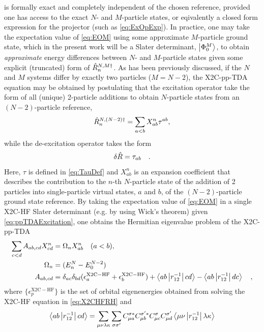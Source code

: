  is formally exact and completely independent of the chosen
reference, provided one has access to the exact $N$- and $M$-particle states,
or eqivalently a closed form expression for the projector (such as \cref{eq:ExOpExp}).
In practice, one may take the expectation value of \cref{eq:EOM} using some
approximate $M$-particle ground state, which in the present work will be
a Slater determinant, $\left\vert \Phi_0^M \right\rangle$, to obtain
\emph{approximate} energy differences between $N$- and $M$-particle states
given some explicit (truncated) form of $\hat{R}^{N,M\dagger}_n$.  As has been previously
discussed, if the $N$ and $M$ systems differ by exactly two particles ($M=N-
2$), the X2C-pp-TDA equation may be obtained by postulating that the excitation
operator take the form of all (unique) 2-particle additions to obtain
$N$-particle states from an $(N-2)$-particle reference,
\begin{equation}
  \hat{R}_n^{N,(N-2)\dagger} = \sum_{a < b} X^n_{ab} \tau^{ab} , \label{eq:ppTDAExcitation}
\end{equation}
while the de-excitation operator takes the form
\begin{equation}
  \delta\hat{R} = \tau_{ab}\quad.
\end{equation}
Here, $\tau$ is defined in \cref{eq:TauDef} and $X^n_{ab}$ is an expansion
coefficient that describes the contribution to the $n$-th $N$-particle state of
the addition of 2 particles into single-particle virtual states, $a$ and $b$,
of the $(N-2)$-particle ground state reference. By taking the expectation value
of \cref{eq:EOM} in a single X2C-HF Slater determinant (e.g. by using Wick's theorem) given
\cref{eq:ppTDAExcitation}, one obtains the Hermitian eigenvalue problem of the
X2C-pp-TDA
\begin{align}
\sum_{c < d} A_{ab,cd} X^n_{cd} &= \Omega_n X^n_{ab} \quad (a < b), \label{eq:ppTDA}\\
\Omega_n &= (E_n^N - E_0^{N-2}) \\
  A_{ab,cd} &= \delta_{ac}\delta_{bd} (\epsilon^\mathrm{X2C-HF}_a + \epsilon^\mathrm{X2C-HF}_b) + \left\langle ab \left\vert r_{12}^{-1} \right\vert cd \right\rangle - \left\langle ab \left\vert r_{12}^{-1} \right\vert dc \right\rangle  \quad \label{eq:AMat},
\end{align}
where  $\{\epsilon^\mathrm{X2C-HF}_p\}$ is the set of orbital
eigenenergies obtained from solving the X2C-HF equation in \cref{eq:X2CHFRH} and
\begin{equation}
  \left\langle ab \left\vert r^{-1}_{12} \right\vert cd \right\rangle = \sum_{\mu\nu\lambda\kappa} \sum_{\sigma\sigma'} 
C^{\sigma*}_{\mu a}
C^{\sigma'*}_{\mu b}
C^{\sigma}_{\mu c}
C^{\sigma'}_{\mu d}
  \left\langle \mu\nu \left\vert r^{-1}_{12} \right\vert \lambda\kappa \right\rangle \label{eq:ERI-MO}
\end{equation}
